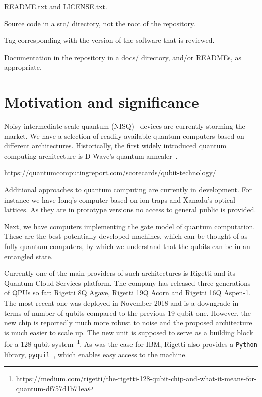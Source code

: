 \documentclass[preprint,12pt, a4paper]{elsarticle}
\newcommand{\1}{{\rm 1\hspace{-0.9mm}l}}
\begin{document}
README.txt and LICENSE.txt.

Source code in a src/ directory, not the root of the repository.

Tag corresponding with the version of the software that is reviewed.

Documentation in the repository in a docs/ directory, and/or READMEs, as 
appropriate.




\section{Motivation and significance}

Noisy intermediate-scale quantum
(NISQ)~\cite{preskill} devices are currently storming the market. We
have a selection of readily available quantum computers based on different
architectures. Historically, the first widely introduced quantum computing
architecture is D-Wave's quantum annealer~\cite{}. 

https://quantumcomputingreport.com/scorecards/qubit-technology/

Additional approaches to quantum computing are currently in development. For 
instance we have Ionq's computer based on ion traps and Xanadu's optical 
lattices. As they are in prototype versions no access to general public is 
provided. 

Next, we have computers implementing the gate model of quantum computation.
These are the best potentially developed machines, which can be thought
of as fully quantum computers, by which we understand that the qubits can be in
an entangled state. 

Currently one of the main providers of such architectures is Rigetti and its 
Quantum Cloud Services platform. The company has
released three generations of QPUs so far: Rigetti 8Q Agave, Rigetti 19Q Acorn
and Rigetti 16Q Aspen-1. The most recent one was deployed in November 2018 and
is a downgrade in terms of number of qubits compared to the previous 19 qubit
one. However, the new chip is reportedly much more robust to noise and the
proposed architecture is much easier to scale up. The new unit is supposed to
serve as a building block for a 128 qubit
system~\footnote{https://medium.com/rigetti/the-rigetti-128-qubit-chip-and-what-it-means-for-quantum-df757d1b71ea}.
As was the case for IBM, Rigetti also provides a \texttt{Python} library, 
\texttt{pyquil}~\cite{}, which enables easy access to the machine.

\end{document}
